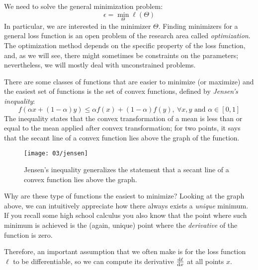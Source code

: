 
We need to solve the general minimization problem:
\begin{equation}
	\epsilon = \min_\Theta \ell(\Theta)
\end{equation}
In particular, we are interested in the minimizer $\Theta$.
Finding minimizers for a general loss function is an open problem of the research area called \emph{optimization}. The optimization method depends on the specific property of the loss function, and, as we will see, there might sometimes be constraints on the parameters; nevertheless, we will mostly deal with unconstrained problems.

There are some classes of functions that are easier to minimize (or maximize) and the easiest set of functions is the set of convex functions, defined by \emph{Jensen's inequality}:
\begin{equation}\label{eq:convexity}
	f(\alpha x + (1 - \alpha)y) \leq \alpha f(x) + (1 - \alpha) f(y), \ \forall x,y \text{ and } \alpha \in [0,1]
\end{equation}
The inequality states that the convex transformation of a mean is less than or equal to the mean applied after convex transformation; for two points, it says that the secant line of a convex function lies above the graph of the function.
\begin{figure}[H]
	\centering
	\texttt{[image: 03/jensen]}
	\caption{Jensen's inequality generalizes the statement that a secant line of a convex function lies above the graph.}\label{fig:jensen}	
\end{figure}

Why are these type of functions the easiest to minimize? Looking at the graph above, we can intuitively appreciate how there always exists a \emph{unique} minimum. If you recall some high school calculus you also know that the point where such minimum is achieved is the (again, unique) point where the \emph{derivative} of the function is zero.

Therefore, an important assumption that we often make is for the loss function $\ell$ to be differentiable, so we can compute its derivative $\dv{\ell}{x}$ at all points $x$. 

